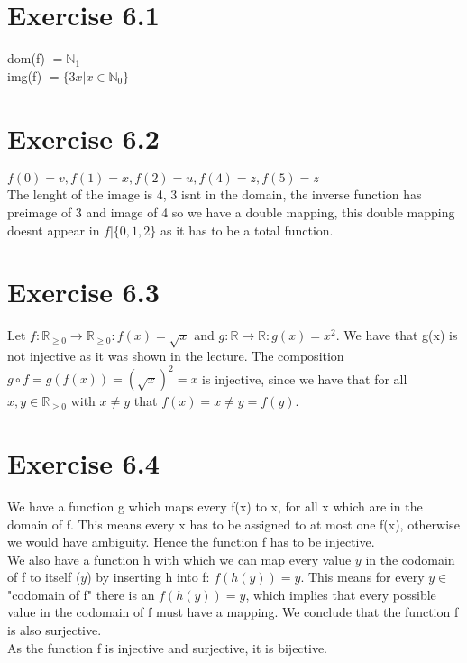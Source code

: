 \documentclass{article} %
\newcommand{\homeworkNumber}{6}
\begin{document}
\section*{Exercise \homeworkNumber.1}
dom(f) $= \mathbb N_1$ \\
img(f) $= \{3x \lvert x \in \mathbb N_0\} $



\section*{Exercise \homeworkNumber.2}
$ f(0) = v, f(1) = x, f(2) = u, f(4) = z, f(5) = z $ \\
The lenght of the image is 4, 3 isnt in the domain, the inverse function has preimage of 3 and image of 4 so we have a double mapping, this double mapping doesnt appear in $f\lvert\{0,1,2\}$ as it has to be a total function.




\section*{Exercise \homeworkNumber.3}
Let \( f \colon \mathbb{R}_{\geq 0} \to \mathbb{R}_{\geq 0} \colon f(x) = \sqrt{x}  \)
and \( g \colon \mathbb{R} \to \mathbb{R} \colon g(x) = x^2  \).
We have that g(x) is not injective as it was shown in the lecture.
The composition \( g \circ f = g(f(x)) = (\sqrt{x})^2 = x \) is injective,
since we have that for all \( x,y \in  \mathbb{R}_{\geq 0} \) with \( x \neq y \) that \( f(x) = x \neq y = f(y) \).



\section*{Exercise \homeworkNumber.4}
We have a function g which maps every f(x) to x, for all x which are in the domain of f. This means every x has to be assigned to at most one f(x), otherwise we would have ambiguity. Hence the function f has to be injective.\\
We also have a function h with which we can map every value $y$ in the codomain of f to itself ($y$) by inserting h into f: $f(h(y)) = y$. This means for every $y \in$ "codomain of f" there is an $f(h(y)) = y$, which implies that every possible value in the codomain of f must have a mapping. We conclude that the function f is also surjective. \\
As the function f is injective and surjective, it is bijective.
\end{document}
